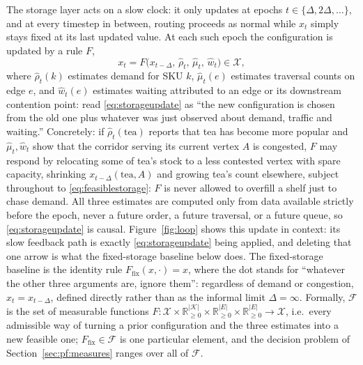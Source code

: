 \documentclass[../main.tex]{subfiles}
\begin{document}
The storage layer acts on a slow clock: it only updates at epochs
$t \in \{\Delta, 2\Delta, \dots\}$, and at every timestep in between,
routing proceeds as normal while $x_t$ simply stays fixed at its last
updated value. At each such epoch the configuration is updated by a rule $F$,
\begin{equation}
  x_t = F\bigl(x_{t-\Delta},\, \hat{\rho}_t,\, \hat{\mu}_t,\, \hat{w}_t\bigr)
        \in \mathcal{X} ,
  \label{eq:storageupdate}
\end{equation}
where $\hat{\rho}_t(k)$ estimates demand for SKU $k$, $\hat{\mu}_t(e)$
estimates traversal counts on edge $e$, and $\hat{w}_t(e)$ estimates waiting
attributed to an edge or its downstream contention point: read
\eqref{eq:storageupdate} as ``the new configuration is chosen from the old
one plus whatever was just observed about demand, traffic and waiting.''
Concretely: if $\hat\rho_t(\mathrm{tea})$ reports that tea has become more
popular and $\hat\mu_t, \hat w_t$ show that the corridor serving its
current vertex $A$ is congested, $F$ may respond by relocating some of
tea's stock to a less contested vertex with spare capacity, shrinking
$x_{t-\Delta}(\mathrm{tea},A)$ and growing tea's count elsewhere, subject
throughout to \eqref{eq:feasiblestorage}: $F$ is never allowed to overfill
a shelf just to chase demand. All three estimates are computed only from
data available strictly before the epoch, never a future order, a future
traversal, or a future queue, so \eqref{eq:storageupdate} is causal.
Figure~\ref{fig:loop} shows this update in context: its slow feedback path
is exactly \eqref{eq:storageupdate} being applied, and deleting that one
arrow is what the fixed-storage baseline below does. The
fixed-storage baseline is the identity rule $F_{\mathrm{fix}}(x,\cdot) = x$,
where the dot stands for ``whatever the other three arguments are, ignore
them'': regardless of demand or congestion, $x_t = x_{t-\Delta}$, defined
directly rather than as the informal limit $\Delta = \infty$. Formally, %
$\mathcal{F}$ is the set of measurable functions
$F : \mathcal{X} \times \mathbb{R}_{\ge 0}^{|\mathcal{K}|} \times
\mathbb{R}_{\ge 0}^{|E|} \times \mathbb{R}_{\ge 0}^{|E|} \to \mathcal{X}$,
i.e.\ every admissible way of turning a prior configuration and the three
estimates into a new feasible one;
$F_{\mathrm{fix}} \in \mathcal{F}$ is one particular element, and the decision
problem of Section~\ref{sec:pf:measures} ranges over all of $\mathcal{F}$.
\end{document}
